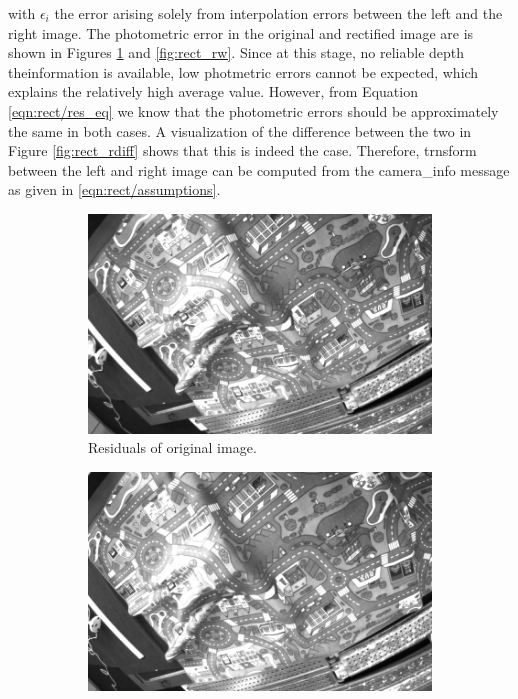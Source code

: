 with $\epsilon_i$ the error arising solely from interpolation errors between the
left and the right image.
The photometric error in the original and rectified image are is shown in Figures
\ref{fig:rect_ru} and \ref{fig:rect_rw}. Since at this stage, no reliable depth
theinformation is available, low photmetric errors cannot be expected, which explains 
the relatively high average value. However, from Equation \ref{eqn:rect/res_eq}
we know that the photometric errors should be approximately the same in both
cases. A visualization of the difference between the two in Figure \ref{fig:rect_rdiff} 
shows that this is indeed the case. Therefore, trnsform between the left and
right image can be computed from the camera\_info message as given in
\ref{eqn:rect/assumptions}.

\begin{figure}[h]
  \centering
  \begin{subfigure}[b]{0.49\textwidth}
    \includegraphics[width=\textwidth]{figures/rect_ru.jpg} 
    \caption{Residuals of original image.}
    \label{fig:rect_ru}
  \end{subfigure}
  \begin{subfigure}[b]{0.49\textwidth}
    \includegraphics[width=\textwidth]{figures/rect_rw.jpg} 

\end{subfigure}
\end{figure}
